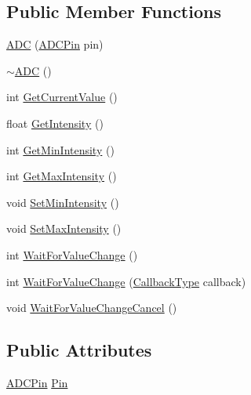 \subsection*{Public Member Functions}
\begin{DoxyCompactItemize}
\item 
\hyperlink{class_hardware_1_1_a_d_c_a33a1de0705c6dd6b549bf5f48b3ff86c}{A\+D\+C} (\hyperlink{class_hardware_1_1_a_d_c_adb1507998c096cbdf7031527f6a690cf}{A\+D\+C\+Pin} pin)
\item 
\hyperlink{class_hardware_1_1_a_d_c_aefd878291d0c14aa524df99af5a63148}{$\sim$\+A\+D\+C} ()
\item 
int \hyperlink{class_hardware_1_1_a_d_c_a9725b2fe1346b17149fb74142e4a8315}{Get\+Current\+Value} ()
\item 
float \hyperlink{class_hardware_1_1_a_d_c_ac38274c9155e3de74276e251286415ce}{Get\+Intensity} ()
\item 
int \hyperlink{class_hardware_1_1_a_d_c_ac571740345f53a3004c3a1c236f938d4}{Get\+Min\+Intensity} ()
\item 
int \hyperlink{class_hardware_1_1_a_d_c_af03f3522f679e266b3a994e30468b5ca}{Get\+Max\+Intensity} ()
\item 
void \hyperlink{class_hardware_1_1_a_d_c_a3703337f2df47ae09c52e6a105e739a3}{Set\+Min\+Intensity} ()
\item 
void \hyperlink{class_hardware_1_1_a_d_c_a998247eb9c5288249b6408312618857a}{Set\+Max\+Intensity} ()
\item 
int \hyperlink{class_hardware_1_1_a_d_c_a7ae87fbf53ba93e33ea6eed41509a1f7}{Wait\+For\+Value\+Change} ()
\item 
int \hyperlink{class_hardware_1_1_a_d_c_a9e1e40c8633ce7bffbfd9f30871290d4}{Wait\+For\+Value\+Change} (\hyperlink{namespace_hardware_a5ba2e4bdfa2bbd8b551b1d5b2a0c61fd}{Callback\+Type} callback)
\item 
void \hyperlink{class_hardware_1_1_a_d_c_aec4d561199bb0f798a28ddd3c8c75543}{Wait\+For\+Value\+Change\+Cancel} ()
\end{DoxyCompactItemize}
\subsection*{Public Attributes}
\begin{DoxyCompactItemize}
\item 
\hyperlink{class_hardware_1_1_a_d_c_adb1507998c096cbdf7031527f6a690cf}{A\+D\+C\+Pin} \hyperlink{class_hardware_1_1_a_d_c_acb6d23369c7047296af402ca480bb2f5}{Pin}
\end{DoxyCompactItemize}
